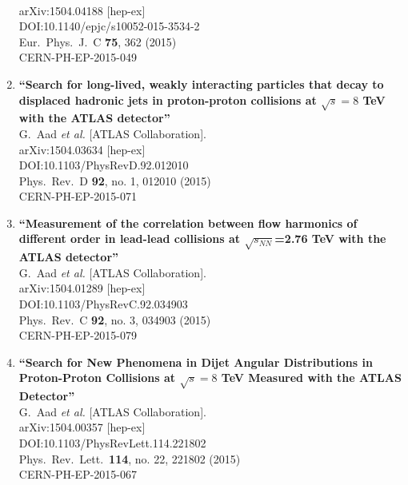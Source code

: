 \documentclass{article}
\begin{document}
\begin{enumerate}
  \\{}arXiv:1504.04188 [hep-ex]
  \\{}DOI:10.1140/epjc/s10052-015-3534-2
  \\{}Eur.\ Phys.\ J.\ C {\bf 75}, 362 (2015)
  \\{}CERN-PH-EP-2015-049
\item%
{\bf ``Search for long-lived, weakly interacting particles that decay to displaced hadronic jets in proton-proton collisions at $\sqrt{s}=8$ TeV with the ATLAS detector''}
  \\{}G.~Aad {\it et al.} [ATLAS Collaboration].
  \\{}arXiv:1504.03634 [hep-ex]
  \\{}DOI:10.1103/PhysRevD.92.012010
  \\{}Phys.\ Rev.\ D {\bf 92}, no. 1, 012010 (2015)
  \\{}CERN-PH-EP-2015-071
\item%
{\bf ``Measurement of the correlation between flow harmonics of different order in lead-lead collisions at $\sqrt{s_{NN}}$=2.76 TeV with the ATLAS detector''}
  \\{}G.~Aad {\it et al.} [ATLAS Collaboration].
  \\{}arXiv:1504.01289 [hep-ex]
  \\{}DOI:10.1103/PhysRevC.92.034903
  \\{}Phys.\ Rev.\ C {\bf 92}, no. 3, 034903 (2015)
  \\{}CERN-PH-EP-2015-079
\item%
{\bf ``Search for New Phenomena in Dijet Angular Distributions in Proton-Proton Collisions at $\sqrt{s} = 8$ TeV Measured with the ATLAS Detector''}
  \\{}G.~Aad {\it et al.} [ATLAS Collaboration].
  \\{}arXiv:1504.00357 [hep-ex]
  \\{}DOI:10.1103/PhysRevLett.114.221802
  \\{}Phys.\ Rev.\ Lett.\  {\bf 114}, no. 22, 221802 (2015)
  \\{}CERN-PH-EP-2015-067

\end{enumerate}
\end{document}
